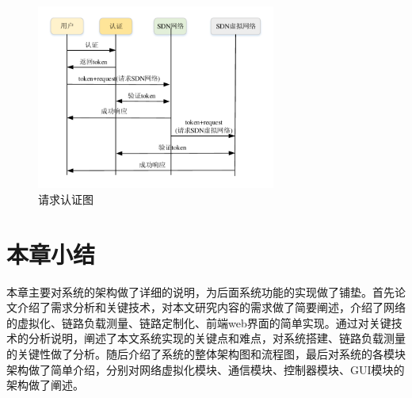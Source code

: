 \begin{figure}[!htb]
  \centering
  \includegraphics[width=0.7\textwidth]{logo/credentials}
  \caption{请求认证图}
  \label{fig:credentials}
\end{figure}

\section{本章小结}
本章主要对系统的架构做了详细的说明，为后面系统功能的实现做了铺垫。首先论文介绍了需求分析和关键技术，对本文研究内容的需求做了简要阐述，介绍了网络的虚拟化、链路负载测量、链路定制化、前端web界面的简单实现。通过对关键技术的分析说明，阐述了本文系统实现的关键点和难点，对系统搭建、链路负载测量的关键性做了分析。随后介绍了系统的整体架构图和流程图，最后对系统的各模块架构做了简单介绍，分别对网络虚拟化模块、通信模块、控制器模块、GUI模块的架构做了阐述。